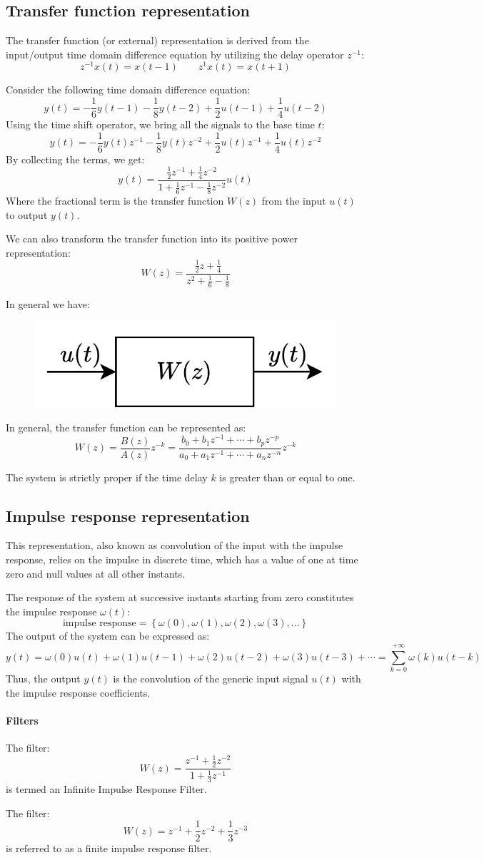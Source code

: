 \subsection{Transfer function representation}
The transfer function (or external) representation is derived from the input/output time domain difference equation by utilizing the delay operator $z^{-1}$: 
\[z^{-1}x(t)=x(t-1) \qquad z^{1}x(t)=x(t+1)\]
\begin{example}
    Consider the following time domain difference equation:
    \[y(t)=-\dfrac{1}{6}y(t-1)-\dfrac{1}{8}y(t-2)+\dfrac{1}{2}u(t-1)+\dfrac{1}{4}u(t-2)\]
    Using the time shift operator, we bring all the signals to the base time $t$: 
    \[y(t)=-\dfrac{1}{6}y(t)z^{-1}-\dfrac{1}{8}y(t)z^{-2}+\dfrac{1}{2}u(t)z^{-1}+\dfrac{1}{4}u(t)z^{-2}\]
    By collecting the terms, we get:
    \[y(t)=\dfrac{\frac{1}{2}z^{-1}+\frac{1}{4}z^{-2}}{1+\frac{1}{6}z^{-1}-\frac{1}{8}z^{-2}}u(t)\]
    Where the fractional term is the transfer function $W(z)$ from the input $u(t)$ to output $y(t)$. 

    We can also transform the transfer function into its positive power representation:
    \[W(z)=\dfrac{\frac{1}{2}z+\frac{1}{4}}{z^2+\frac{1}{6}-\frac{1}{8}}\]
\end{example}
In general we have: 
\begin{figure}[H]
    \centering
    \includegraphics[width=0.4\linewidth]{images/transfer.png}
\end{figure}
In general, the transfer function can be represented as:
\[W(z)=\dfrac{B(z)}{A(z)}z^{-k}=\dfrac{b_0+b_1 z^{-1}+\cdots+b_p z^{-p}}{a_0+a_1 z^{-1}+\cdots+a_n z^{-n}}z^{-k}\]
\begin{property}
    The system is strictly proper if the time delay $k$ is greater than or equal to one.
\end{property}    

\subsection{Impulse response representation}
This representation, also known as convolution of the input with the impulse response, relies on the impulse in discrete time, which has a value of one at time zero and null values at all other instants.

The response of the system at successive instants starting from zero constitutes the impulse response $\omega(t)$: 
\[\text{impulse response}=\left\{ \omega(0),\omega(1),\omega(2),\omega(3),\dots \right\}\]
The output of the system can be expressed as:
\[y(t)=\omega(0)u(t)+\omega(1)u(t-1)+\omega(2)u(t-2)+\omega(3)u(t-3)+\cdots=\sum_{k=0}^{+\infty}\omega(k)u(t-k)\]
Thus, the output $y(t)$ is the convolution of the generic input signal $u(t)$ with the impulse response coefficients.

\paragraph*{Filters}
The filter: 
\[W(z)=\dfrac{z^{-1}+\frac{1}{2}z^{-2}}{1+\frac{1}{3}z^{-1}}\]
is termed an Infinite Impulse Response Filter.

The filter: 
\[W(z)=z^{-1}+\dfrac{1}{2}z^{-2}+\dfrac{1}{3}z^{-3}\]
is referred to as a finite impulse response filter.
